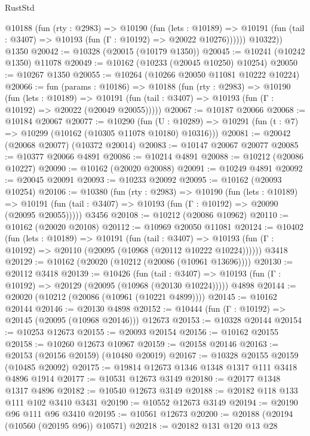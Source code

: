 \begin{lexlean}{RustStd}
\begin{coremodule}
          @10188
            (fun (rty : @2983) =>
            @10190
              (fun (lets : @10189) =>
              @10191 (fun (tail : @3407) => @10193 (fun (Γ : @10192) => @20022 @10276))))))
        @10322))
    @1350
@20042 := @10328 (@20015 (@10179 @1350))
@20045 := @10241 (@10242 @1350) @11078
@20049 := @10162 (@10233 (@20045 @10250) @10254)
@20050 := @10267 @1350
@20055 := @10264 (@10266 @20050 @11081 @10222 @10224)
@20066 := fun (params : @10186) =>
  @10188
    (fun (rty : @2983) =>
    @10190
      (fun (lets : @10189) =>
      @10191 (fun (tail : @3407) => @10193 (fun (Γ : @10192) => @20022 (@20049 @20055)))))
@20067 := @10187 @20066
@20068 := @10184 @20067
@20077 := @10290
    (fun (U : @10289) => @10291 (fun (t : @7) => @10299 (@10162 (@10305 @11078 @10180) @10316)))
@20081 := @20042 (@20068 @20077) (@10372 @20014)
@20083 := @10147 @20067 @20077
@20085 := @10377 @20066 @4891
@20086 := @10214 @4891
@20088 := @10212 (@20086 @10227)
@20090 := @10162 (@20020 @20088)
@20091 := @10249 @4891
@20092 := @20045 @20091
@20093 := @10233 @20092
@20095 := @10162 (@20093 @10254)
@20106 := @10380
    (fun (rty : @2983) =>
    @10190
      (fun (lets : @10189) =>
      @10191 (fun (tail : @3407) => @10193 (fun (Γ : @10192) => @20090 (@20095 @20055)))))
    @3456
@20108 := @10212 (@20086 @10962)
@20110 := @10162 (@20020 @20108)
@20112 := @10969 @20050 @11081
@20124 := @10402
    (fun (lets : @10189) =>
    @10191
      (fun (tail : @3407) =>
      @10193 (fun (Γ : @10192) => @20110 (@20095 (@10968 (@20112 @10222 @10224))))))
    @3418
@20129 := @10162 (@20020 (@10212 (@20086 (@10961 @13696))))
@20130 := @20112 @3418
@20139 := @10426
    (fun (tail : @3407) => @10193 (fun (Γ : @10192) => @20129 (@20095 (@10968 (@20130 @10224)))))
    @4898
@20144 := @20020 (@10212 (@20086 (@10961 (@10221 @4899))))
@20145 := @10162 @20144
@20146 := @20130 @4898
@20152 := @10444 (fun (Γ : @10192) => @20145 (@20095 (@10968 @20146))) @12673
@20153 := @10328 @20144
@20154 := @10253 @12673
@20155 := @20093 @20154
@20156 := @10162 @20155
@20158 := @10260 @12673 @10967
@20159 := @20158 @20146
@20163 := @20153 (@20156 @20159) (@10480 @20019)
@20167 := @10328 @20155 @20159 (@10485 @20092)
@20175 := @19814 @12673 @1346 @1348 @1317 @111 @3418 @4896 @1914
@20177 := @10531 @12673 @3149
@20180 := @20177 @1348 @1317 @4896
@20182 := @10540 @12673 @3149
@20188 := @20182 @118 @133 @111 @102 @3410 @3431
@20190 := @10552 @12673 @3149
@20194 := @20190 @96 @111 @96 @3410
@20195 := @10561 @12673
@20200 := @20188 (@20194 (@10560 (@20195 @96)) @10571)
@20218 := @20182
    @131
    @120
    @13
    @28

\end{coremodule}
\end{lexlean}
